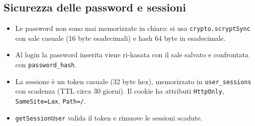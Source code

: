 \documentclass[11pt,a4paper]{article}
\begin{document}
\subsection{Sicurezza delle password e sessioni}
\begin{itemize}[leftmargin=*]
  \item Le password non sono mai memorizzate in chiaro: si usa \texttt{crypto.scryptSync} con sale casuale (16 byte esadecimali) e hash 64 byte in esadecimale.
  \item Al login la password inserita viene ri-hasata con il sale salvato e confrontata con \texttt{password\_hash}.
  \item La sessione è un token casuale (32 byte hex), memorizzato in \texttt{user\_sessions} con scadenza (TTL circa 30 giorni). Il cookie ha attributi \texttt{HttpOnly}, \texttt{SameSite=Lax}, \texttt{Path=/}.
  \item \texttt{getSessionUser} valida il token e rimuove le sessioni scadute.
\end{itemize}
\end{document}
